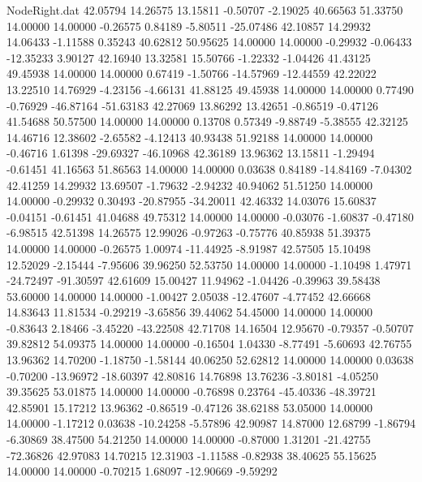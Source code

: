 \begin{filecontents}{NodeRight.dat}
  42.05794   14.26575   13.15811    -0.50707   -2.19025   40.66563   51.33750   14.00000   14.00000   -0.26575    0.84189   -5.80511  -25.07486
  42.10857   14.29932   14.06433    -1.11588    0.35243   40.62812   50.95625   14.00000   14.00000   -0.29932   -0.06433  -12.35233    3.90127
  42.16940   13.32581   15.50766    -1.22332   -1.04426   41.43125   49.45938   14.00000   14.00000    0.67419   -1.50766  -14.57969  -12.44559
  42.22022   13.22510   14.76929    -4.23156   -4.66131   41.88125   49.45938   14.00000   14.00000    0.77490   -0.76929  -46.87164  -51.63183
  42.27069   13.86292   13.42651    -0.86519   -0.47126   41.54688   50.57500   14.00000   14.00000    0.13708    0.57349   -9.88749   -5.38555
  42.32125   14.46716   12.38602    -2.65582   -4.12413   40.93438   51.92188   14.00000   14.00000   -0.46716    1.61398  -29.69327  -46.10968
  42.36189   13.96362   13.15811    -1.29494   -0.61451   41.16563   51.86563   14.00000   14.00000    0.03638    0.84189  -14.84169   -7.04302
  42.41259   14.29932   13.69507    -1.79632   -2.94232   40.94062   51.51250   14.00000   14.00000   -0.29932    0.30493  -20.87955  -34.20011
  42.46332   14.03076   15.60837    -0.04151   -0.61451   41.04688   49.75312   14.00000   14.00000   -0.03076   -1.60837   -0.47180   -6.98515
  42.51398   14.26575   12.99026    -0.97263   -0.75776   40.85938   51.39375   14.00000   14.00000   -0.26575    1.00974  -11.44925   -8.91987
  42.57505   15.10498   12.52029    -2.15444   -7.95606   39.96250   52.53750   14.00000   14.00000   -1.10498    1.47971  -24.72497  -91.30597
  42.61609   15.00427   11.94962    -1.04426   -0.39963   39.58438   53.60000   14.00000   14.00000   -1.00427    2.05038  -12.47607   -4.77452
  42.66668   14.83643   11.81534    -0.29219   -3.65856   39.44062   54.45000   14.00000   14.00000   -0.83643    2.18466   -3.45220  -43.22508
  42.71708   14.16504   12.95670    -0.79357   -0.50707   39.82812   54.09375   14.00000   14.00000   -0.16504    1.04330   -8.77491   -5.60693
  42.76755   13.96362   14.70200    -1.18750   -1.58144   40.06250   52.62812   14.00000   14.00000    0.03638   -0.70200  -13.96972  -18.60397
  42.80816   14.76898   13.76236    -3.80181   -4.05250   39.35625   53.01875   14.00000   14.00000   -0.76898    0.23764  -45.40336  -48.39721
  42.85901   15.17212   13.96362    -0.86519   -0.47126   38.62188   53.05000   14.00000   14.00000   -1.17212    0.03638  -10.24258   -5.57896
  42.90987   14.87000   12.68799    -1.86794   -6.30869   38.47500   54.21250   14.00000   14.00000   -0.87000    1.31201  -21.42755  -72.36826
  42.97083   14.70215   12.31903    -1.11588   -0.82938   38.40625   55.15625   14.00000   14.00000   -0.70215    1.68097  -12.90669   -9.59292

\end{filecontents}
